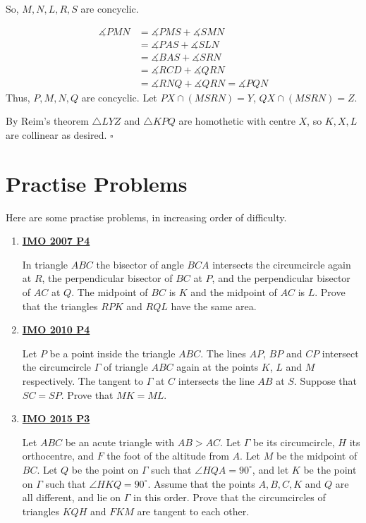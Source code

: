 \documentclass[10pt,letterpaper]{article}
\begin{document}
So, $M,N,L,R,S$ are concyclic.

\begin{align*}\measuredangle PMN&=\measuredangle PMS+\measuredangle SMN\\&=\measuredangle PAS+\measuredangle SLN\\&=\measuredangle BAS+\measuredangle SRN\\&=\measuredangle RCD+\measuredangle QRN\\&=\measuredangle RNQ+\measuredangle QRN=\measuredangle PQN\end{align*}Thus, $P,M,N,Q$ are concyclic. Let $PX\cap (MSRN)=Y$, $QX\cap (MSRN)=Z$.

By Reim's theorem $\triangle LYZ$ and $\triangle KPQ$ are homothetic with centre $X$, so $K,X,L$ are collinear as desired. $\square$
\nopagebreak[4]\par{}
\par\vspace{12pt}\newpage
\section{Practise Problems}
Here are some practise problems, in increasing order of difficulty.
\begin{enumerate}
\item \textbf{\href{https://www.imo-official.org/assets/documents/problems/2007/2007_eng.pdf}{IMO 2007 P4}}

In triangle $ABC$ the bisector of angle $BCA$ intersects the circumcircle again at $R$, the perpendicular bisector of $BC$ at $P$, and the perpendicular bisector of $AC$ at $Q$. The midpoint of $BC$ is $K$ and the midpoint of $AC$ is $L$. Prove that the triangles $RPK$ and $RQL$ have the same area.
\item \textbf{\href{https://www.imo-official.org/assets/documents/problems/2010/2010_eng.pdf}{IMO 2010 P4}}

Let $P$ be a point inside the triangle $ABC$. The lines $AP$, $BP$ and $CP$ intersect the circumcircle $\Gamma$ of triangle $ABC$ again at the points $K$, $L$ and $M$ respectively. The tangent to $\Gamma$ at $C$ intersects the line $AB$ at $S$. Suppose that $SC=SP$. Prove that $MK=ML$.
\item \textbf{\href{https://www.imo-official.org/assets/documents/problems/2015/2015_eng.pdf}{IMO 2015 P3}}

Let $ABC$ be an acute triangle with $AB>AC$. Let $\Gamma$ be its circumcircle, $H$ its orthocentre, and $F$ the foot of the altitude from $A$. Let $M$ be the midpoint of $BC$. Let $Q$ be the point on $\Gamma$ such that $\angle HQA=90^\circ$, and let $K$ be the point on $\Gamma$ such that $\angle HKQ=90^\circ$. Assume that the points $A,B,C,K$ and $Q$ are all different, and lie on $\Gamma$ in this order. Prove that the circumcircles of triangles $KQH$ and $FKM$ are tangent to each other.
\end{enumerate}
\end{document}
